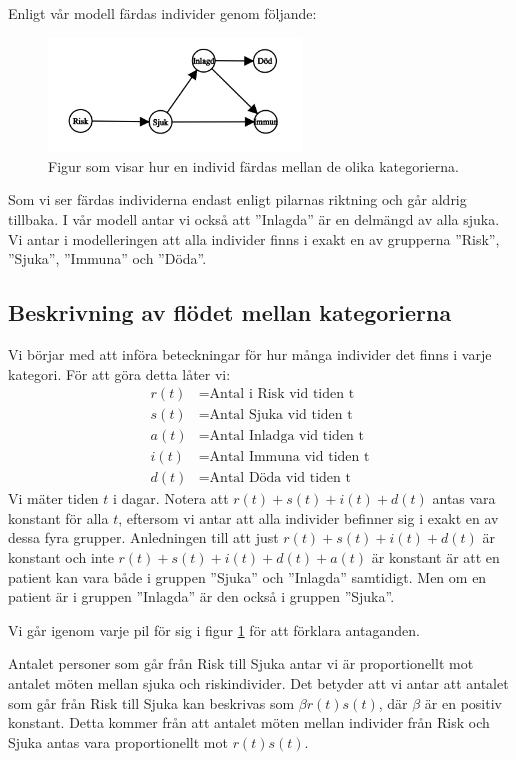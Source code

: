 \documentclass[a4paper, 12pt]{article}
\theoremstyle{definition}
\begin{document}
Enligt vår modell färdas individer genom följande:
\begin{figure}[H]
\centering
\includegraphics[width=0.6\textwidth]{bilder/flow.png}
\caption{Figur som visar hur en individ färdas mellan de olika kategorierna.}\label{Fig: flow}
\end{figure}
Som vi ser färdas individerna endast enligt pilarnas riktning och går aldrig tillbaka. I vår modell antar vi också att ''Inlagda'' är en delmängd av alla sjuka. Vi antar i modelleringen att alla individer finns i exakt en av grupperna ''Risk'', ''Sjuka'', ''Immuna'' och ''Döda''.

\subsection{Beskrivning av flödet mellan kategorierna}
Vi börjar med att införa beteckningar för hur många individer det finns i varje kategori. För att göra detta låter vi:
\begin{align*}
  r(t) &= \text{Antal i Risk vid tiden t} \\
  s(t) &= \text{Antal Sjuka vid tiden t} \\
  a(t) &= \text{Antal Inladga vid tiden t} \\
  i(t) &= \text{Antal Immuna vid tiden t} \\
  d(t) &= \text{Antal Döda vid tiden t}
\end{align*}
Vi mäter tiden $t$ i dagar. Notera att $r(t)+s(t)+i(t)+d(t)$ antas vara konstant för alla $t$, eftersom vi antar att alla individer befinner sig i exakt en av dessa fyra grupper. Anledningen till att just $r(t)+s(t)+i(t)+d(t)$ är konstant och inte $r(t)+s(t)+i(t)+d(t)+a(t)$ är konstant är att en patient kan vara både i gruppen ''Sjuka'' och ''Inlagda'' samtidigt. Men om en patient är i gruppen ''Inlagda'' är den också i gruppen ''Sjuka''.

Vi går igenom varje pil för sig i figur \ref{Fig: flow} för att förklara antaganden.

Antalet personer som går från Risk till Sjuka antar vi är proportionellt mot antalet möten mellan sjuka och riskindivider. Det betyder att vi antar att antalet som går från Risk till Sjuka kan beskrivas som $\beta r(t)s(t)$, där $\beta$ är en positiv konstant. Detta kommer från att antalet möten mellan individer från Risk och Sjuka antas vara proportionellt mot $r(t)s(t)$.
\end{document}
